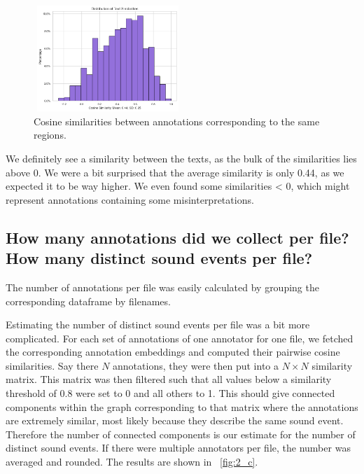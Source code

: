 \documentclass{article}
\begin{document}
\begin{figure}[htbp]
  \centering
  \includegraphics[width=0.5\textwidth, height=4cm]{figs/sim_diffs.png}
  \caption{Cosine similarities between annotations corresponding to the same regions.}
  \label{fig:2_b}
\end{figure}

We definitely see a similarity between the texts, as the bulk of the similarities lies above 0. We were a bit surprised that the average similarity is only 0.44, as we expected it to be way higher. We even found some similarities < 0, which might represent annotations containing some misinterpretations.

\subsection{How many annotations did we collect per file? How many distinct sound events per file?}
\label{sec:Annotation Quality:a2}
The number of annotations per file was easily calculated by grouping the corresponding dataframe by filenames.

Estimating the number of distinct sound events per file was a bit more complicated. For each set of annotations of one annotator for one file, we fetched the corresponding annotation embeddings and computed their pairwise cosine similarities. Say there $N$ annotations, they were then put into a $N \times N$ similarity matrix. This matrix was then filtered such that all values below a similarity threshold of 0.8 were set to 0 and all others to 1. This should give connected components within the graph corresponding to that matrix where the annotations are extremely similar, most likely because they describe the same sound event. Therefore the number of connected components is our estimate for the number of distinct sound events. If there were multiple annotators per file, the number was averaged and rounded. The results are shown in ~\ref{fig:2_c}.
\end{document}
